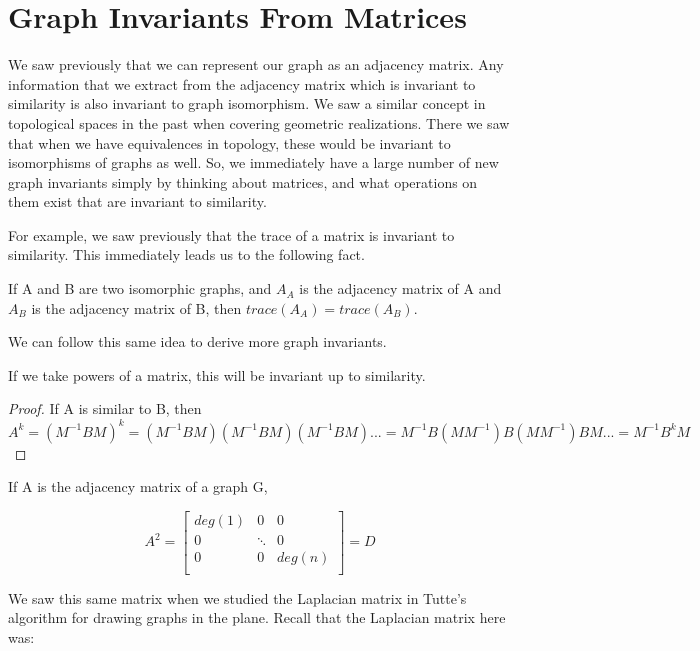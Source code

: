 \documentclass{article}
\begin{document}
    \section{Graph Invariants From Matrices}
    We saw previously that we can represent our graph as an adjacency matrix. Any information that we extract from the adjacency matrix which is invariant to similarity is also invariant to graph isomorphism. We saw a similar concept in topological spaces in the past when covering geometric realizations. There we saw that when we have equivalences in topology, these would be invariant to isomorphisms of graphs as well. So, we immediately have a large number of new graph invariants simply by thinking about matrices, and what operations on them exist that are invariant to similarity.
    
    For example, we saw previously that the trace of a matrix is invariant to similarity. This immediately leads us to the following fact.
    
    \begin{corollary}
    If A and B are two isomorphic graphs, and $A_A$ is the adjacency matrix of A and $A_B$ is the adjacency matrix of B, then $trace(A_A) = trace(A_B)$.
    \end{corollary}
    
    We can follow this same idea to derive more graph invariants.
    
    \begin{theorem}
    If we take powers of a matrix, this will be invariant up to similarity.
    \end{theorem}
    
    \begin{proof}
    If A is similar to B, then 
    \\
    $A^k = (M^{-1}BM)^k = (M^{-1}BM)(M^{-1}BM)(M^{-1}BM)... = M^{-1}B(MM^{-1})B(MM^{-1})BM... = M^{-1}B^kM$ 
    \end{proof}
    
    If A is the adjacency matrix of a graph G,
    
    $$A^2 = \begin{bmatrix}
            deg(1) & 0 & 0 \\
            0 & \ddots & 0 \\
            0 & 0 & deg(n) \\

        \end{bmatrix} = D$$
    
    We saw this same matrix when we studied the Laplacian matrix in Tutte's algorithm for drawing graphs in the plane. Recall that the Laplacian matrix here was: 
    
\end{document}

